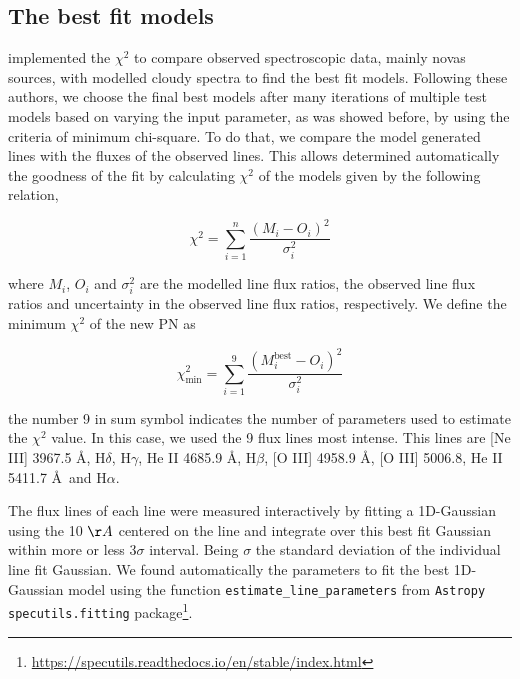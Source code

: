 \documentclass[fleqn,usenatbib]{mnras}
\begin{document}
\subsection{The best fit models}
\label{sec:best-fit}

\citet{Helton:2010, Mondal:2018, Pavana:2019, Mondal:2020, Pandey:2022a, Pandey:2022b}
implemented the $\chi^2$ to compare observed spectroscopic data,
mainly novas sources, with modelled {\sc cloudy} spectra to find the best
fit models. Following these authors, we choose the final best models
after many iterations of multiple test models based on varying the input parameter,
as was showed before, by using the criteria of minimum chi-square.
To do that, we compare the model generated lines with the fluxes of the observed lines.
This allows determined automatically the goodness of the fit by
calculating $\chi^{2}$ of the models given by the following relation,

\begin{equation}
  \chi^{2} = \sum^{n}_{i = 1} \frac{(M_i - O_i)^2}{\sigma^{2}_i}
  \label{eq:chi}
\end{equation}

where $M_i$, $O_i$ and $\sigma^{2}_i$ are the modelled line flux ratios, the observed line flux
ratios and uncertainty in the observed line flux ratios, respectively. We define the minimum
$\chi^{2}$ of the new PN as

\begin{equation}
   \chi^{2}_{\text{min}} = \sum^{9}_{i = 1} \frac{(M^{\text{best}}_i - O_i)^2}{\sigma^{2}_i}
  \label{eq:chi-red}
\end{equation}

the number 9 in sum symbol indicates the number of parameters used to estimate the  $\chi^{2}$
value. In this case, we used the 9 flux lines most intense.
This lines are [Ne III] 3967.5 \AA, H$\delta$, H$\gamma$, He II 4685.9 \AA, H$\beta$, [O III] 4958.9 \AA,
[O III] 5006.8, He II 5411.7 \AA~and H{$\alpha$}.

The flux lines of each line were measured interactively by fitting a 1D-Gaussian using
the 10 $\AA$ centered on the line and integrate over this best fit Gaussian within more
or less 3$\sigma$ interval. Being $\sigma$ the standard deviation of the individual
line fit Gaussian. We found automatically the parameters to fit the best 1D-Gaussian model
using the function \texttt{estimate\_line\_parameters} from \texttt{Astropy specutils.fitting}
package\footnote{\url{https://specutils.readthedocs.io/en/stable/index.html}}.
\end{document}
